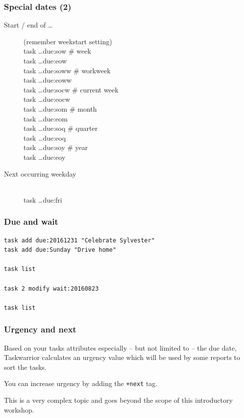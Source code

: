 \documentclass[t,handout]{beamer}
\begin{document}
\begin{frame}[fragile]\frametitle{Special dates (2)}
    \begin{description}
        \item[Start / end of \ldots] (remember weekstart setting) \hfill \\
            task \ldots due:sow \# week \\
            task \ldots due:eow \\
            task \ldots due:soww \# workweek \\
            task \ldots due:eoww \\
            task \ldots due:socw \# current week \\
            task \ldots due:eocw \\
            task \ldots due:som \# month \\
            task \ldots due:eom \\
            task \ldots due:soq \# quarter \\
            task \ldots due:eoq \\
            task \ldots due:soy \# year \\
            task \ldots due:eoy \\
        \item[Next occurring weekday] \hfill \\
            task \ldots due:fri
    \end{description}
\end{frame}

\begin{frame}[fragile]\frametitle{Due and wait}
    \vfill
    \begin{lstlisting}
task add due:20161231 "Celebrate Sylvester"
task add due:Sunday "Drive home"

task list

task 2 modify wait:20160823

task list\end{lstlisting}
\end{frame}

\begin{frame}[fragile]\frametitle{Urgency and next}
    \vfill
    Based on your tasks attributes especially -- but not limited to -- the due date, Taskwarrior calculates an urgency value which will be used by some reports to sort the tasks.

    You can increase urgency by adding the \verb=+next= tag.

    This is a very complex topic and goes beyond the scope of this introductory workshop.
\end{frame}
\end{document}
